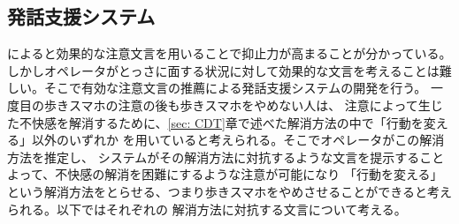\documentclass{kuisthesis}
\begin{document}


\subsection{発話支援システム}
\cite{Schneider2022}によると効果的な注意文言を用いることで抑止力が高まることが分かっている。
しかしオペレータがとっさに面する状況に対して効果的な文言を考えることは難しい。そこで有効な注意文言の推薦による発話支援システムの開発を行う。
一度目の歩きスマホの注意の後も歩きスマホをやめない人は、
注意によって生じた不快感を解消するために、\ref{sec: CDT}章で述べた解消方法の中で「行動を変える」以外のいずれか
を用いていると考えられる。そこでオペレータがこの解消方法を推定し、
システムがその解消方法に対抗するような文言を提示することよって、不快感の解消を困難にするような注意が可能になり
「行動を変える」という解消方法をとらせる、つまり歩きスマホをやめさせることができると考えられる。以下ではそれぞれの
解消方法に対抗する文言について考える。
\end{document}
